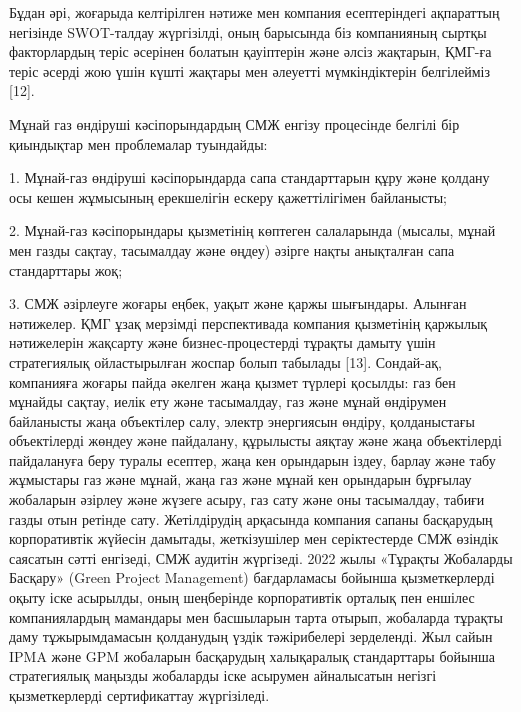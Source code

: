 \begin{multicols}{2}
Бұдан әрі, жоғарыда келтірілген нәтиже мен компания есептеріндегі
ақпараттың негізінде SWOT-талдау жүргізілді, оның барысында біз
компанияның сыртқы факторлардың теріс әсерінен болатын қауіптерін және
әлсіз жақтарын, ҚМГ-ға теріс әсерді жою үшін күшті жақтары мен әлеуетті
мүмкіндіктерін белгілейміз {[}12{]}.

Мұнай газ өндіруші кәсіпорындардың СМЖ енгізу процесінде белгілі бір
қиындықтар мен проблемалар туындайды:

1. Мұнай-газ өндіруші кәсіпорындарда сапа стандарттарын құру және
қолдану осы кешен жұмысының ерекшелігін ескеру қажеттілігімен
байланысты;

2. Мұнай-газ кәсіпорындары қызметінің көптеген салаларында (мысалы,
мұнай мен газды сақтау, тасымалдау және өңдеу) әзірге нақты анықталған
сапа стандарттары жоқ;

3. СМЖ әзірлеуге жоғары еңбек, уақыт және қаржы шығындары. Алынған
нәтижелер. ҚМГ ұзақ мерзімді перспективада компания қызметінің қаржылық
нәтижелерін жақсарту және бизнес-процестерді тұрақты дамыту үшін
стратегиялық ойластырылған жоспар болып табылады {[}13{]}. Сондай-ақ,
компанияға жоғары пайда әкелген жаңа қызмет түрлері қосылды: газ бен
мұнайды сақтау, иелік ету және тасымалдау, газ және мұнай өндірумен
байланысты жаңа объектілер салу, электр энергиясын өндіру, қолданыстағы
объектілерді жөндеу және пайдалану, құрылысты аяқтау және жаңа
объектілерді пайдалануға беру туралы есептер, жаңа кен орындарын іздеу,
барлау және табу жұмыстары газ және мұнай, жаңа газ және мұнай кен
орындарын бұрғылау жобаларын әзірлеу және жүзеге асыру, газ сату және
оны тасымалдау, табиғи газды отын ретінде сату. Жетілдірудің арқасында
компания сапаны басқарудың корпоративтік жүйесін дамытады, жеткізушілер
мен серіктестерде СМЖ өзіндік саясатын сәтті енгізеді, СМЖ аудитін
жүргізеді. 2022 жылы «Тұрақты Жобаларды Басқару» (Green Project
Management) бағдарламасы бойынша қызметкерлерді оқыту іске асырылды,
оның шеңберінде корпоративтік орталық пен еншілес компаниялардың
мамандары мен басшыларын тарта отырып, жобаларда тұрақты даму
тұжырымдамасын қолданудың үздік тәжірибелері зерделенді. Жыл сайын IPMA
және GPM жобаларын басқарудың халықаралық стандарттары бойынша
стратегиялық маңызды жобаларды іске асырумен айналысатын негізгі
қызметкерлерді сертификаттау жүргізіледі.
\end{multicols}

